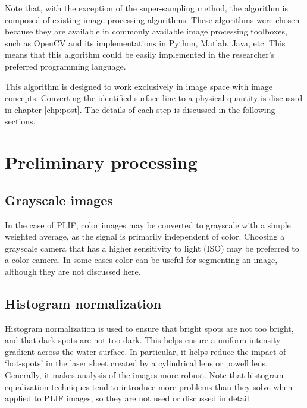 %
Note that, with the exception of the super-sampling method, the algorithm is composed of existing image processing algorithms.
These algorithms were chosen because they are available in commonly available image processing toolboxes, such as OpenCV and its implementations in Python, Matlab, Java, etc.
This means that this algorithm could be easily implemented in the researcher's preferred programming language.
\par
This algorithm is designed to work exclusively in image space with image concepts.
Converting the identified surface line to a physical quantity is discussed in chapter \ref{chp:post}.
The details of each step is discussed in the following sections.
%
\section{Preliminary processing} \label{sec:prelimprocess}
%
\subsection{Grayscale images} \label{sec:greyscale}
\par
In the case of PLIF, color images may be converted to grayscale with a simple weighted average, as the signal is primarily independent of color.
Choosing a grayscale camera that has a higher sensitivity to light (ISO) may be preferred to a color camera.
In some cases color can be useful for segmenting an image, although they are not discussed here.
%
\subsection{Histogram normalization} \label{sec:normalize}
\par
Histogram normalization is used to ensure that bright spots are not too bright, and that dark spots are not too dark.
This helps ensure a uniform intensity gradient across the water surface.
In particular, it helps reduce the impact of `hot-spots' in the laser sheet created by a cylindrical lens or powell lens.
Generally, it makes analysis of the images more robust.
Note that histogram equalization techniques tend to introduce more problems than they solve when applied to PLIF images, so they are not used or discussed in detail.
%
